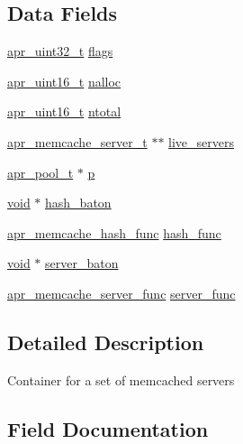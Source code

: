 \subsection*{Data Fields}
\begin{DoxyCompactItemize}
\item 
\hyperlink{group__apr__platform_ga558548a135d8a816c4787250744ea147}{apr\+\_\+uint32\+\_\+t} \hyperlink{structapr__memcache__t_aeb0639bc75fd5bc7561ab88f671f75d3}{flags}
\item 
\hyperlink{group__apr__platform_ga3fb87c977e28a526d872d1081411b129}{apr\+\_\+uint16\+\_\+t} \hyperlink{structapr__memcache__t_a95d15cfa5b291700cd9a697687eeac73}{nalloc}
\item 
\hyperlink{group__apr__platform_ga3fb87c977e28a526d872d1081411b129}{apr\+\_\+uint16\+\_\+t} \hyperlink{structapr__memcache__t_a94e1353d23d4d02a18a9f0ca0e90005d}{ntotal}
\item 
\hyperlink{structapr__memcache__server__t}{apr\+\_\+memcache\+\_\+server\+\_\+t} $\ast$$\ast$ \hyperlink{structapr__memcache__t_a85f916183d0aae6aaa88251edc7a1f81}{live\+\_\+servers}
\item 
\hyperlink{structapr__pool__t}{apr\+\_\+pool\+\_\+t} $\ast$ \hyperlink{structapr__memcache__t_a5157d1b71f12ecbdf8439eca46525c87}{p}
\item 
\hyperlink{group__MOD__ISAPI_gacd6cdbf73df3d9eed42fa493d9b621a6}{void} $\ast$ \hyperlink{structapr__memcache__t_a26614ee9cfdc014d7e5ea46df253193a}{hash\+\_\+baton}
\item 
\hyperlink{group__APR__Util__MC_ga61c818502b23997917b731adff0f4d27}{apr\+\_\+memcache\+\_\+hash\+\_\+func} \hyperlink{structapr__memcache__t_ac63433f48f39aab248e93a12109c2028}{hash\+\_\+func}
\item 
\hyperlink{group__MOD__ISAPI_gacd6cdbf73df3d9eed42fa493d9b621a6}{void} $\ast$ \hyperlink{structapr__memcache__t_aea9d227dec27ab31af244d5759c3939a}{server\+\_\+baton}
\item 
\hyperlink{group__APR__Util__MC_ga483e49c8fe3b82c5b54bae92503f0a0a}{apr\+\_\+memcache\+\_\+server\+\_\+func} \hyperlink{structapr__memcache__t_a010fc90cc07583737ab09f958d182b8d}{server\+\_\+func}
\end{DoxyCompactItemize}


\subsection{Detailed Description}
Container for a set of memcached servers 

\subsection{Field Documentation}
